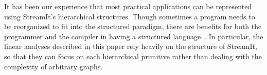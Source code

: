 It has been our experience that most practical applications can be
represented using StreamIt's hierarchical structures.  Though
sometimes a program needs to be reorganized to fit into the structured
paradigm, there are benefits for both the programmer and the compiler
in having a structured language~\cite{streamitcc}.  In particular, the
linear analyses described in this paper rely heavily on the structure
of StreamIt, so that they can focus on each hierarchical primitive rather
than dealing with the complexity of arbitrary graphs.
